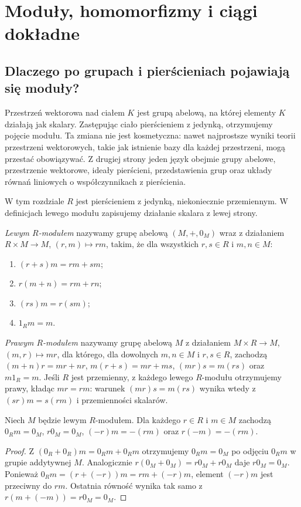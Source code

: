 \setlength{\parskip}{3pt}
\chapter{Moduły, homomorfizmy i ciągi dokładne}
\label{aa:ch:modules-introduction}

\providecommand{\atlasref}[2]{#2}


\section{Dlaczego po grupach i pierścieniach pojawiają się moduły?}
Przestrzeń wektorowa nad ciałem $K$ jest grupą abelową,
na której elementy $K$ działają jak skalary.
Zastępując ciało pierścieniem z jedynką, otrzymujemy
pojęcie modułu. Ta zmiana nie jest kosmetyczna: nawet
najprostsze wyniki teorii przestrzeni wektorowych,
takie jak istnienie bazy dla każdej przestrzeni, mogą
przestać obowiązywać. Z drugiej strony jeden język
obejmie grupy abelowe, przestrzenie wektorowe,
ideały pierścieni, przedstawienia grup oraz układy
równań liniowych o współczynnikach z pierścienia.

W tym rozdziale $R$ jest pierścieniem z jedynką,
niekoniecznie przemiennym. W definicjach lewego
modułu zapisujemy działanie skalara z lewej strony.

\begin{definicja}
\label{aa:def:modules-full}
\emph{Lewym $R$-modułem} nazywamy grupę abelową
$(M,+,0_M)$ wraz z działaniem $R\times M\to M$,
$(r,m)\mapsto rm$, takim, że dla wszystkich
$r,s\in R$ i $m,n\in M$:
\begin{enumerate}[label=\textup{(M\arabic*)}]
\item $(r+s)m=rm+sm$;
\item $r(m+n)=rm+rn$;
\item $(rs)m=r(sm)$;
\item $1_Rm=m$.
\end{enumerate}
\emph{Prawym $R$-modułem} nazywamy grupę abelową $M$
z działaniem $M\times R\to M$, $(m,r)\mapsto mr$,
dla którego, dla dowolnych $m,n\in M$ i $r,s\in R$,
zachodzą
$(m+n)r=mr+nr$, $m(r+s)=mr+ms$,
$(mr)s=m(rs)$ oraz $m1_R=m$.
Jeśli $R$ jest przemienny, z każdego lewego
$R$-modułu otrzymujemy prawy, kładąc $mr=rm$:
warunek $(mr)s=m(rs)$ wynika wtedy z
$(sr)m=s(rm)$ i przemienności skalarów.
\end{definicja}

\begin{stwierdzenie}
\label{aa:st:modules-zero-laws}
Niech $M$ będzie lewym $R$-modułem. Dla każdego
$r\in R$ i $m\in M$ zachodzą
$0_Rm=0_M$, $r0_M=0_M$,
$(-r)m=-(rm)$ oraz $r(-m)=-(rm)$.
\end{stwierdzenie}
\begin{proof}
Z $(0_R+0_R)m=0_Rm+0_Rm$ otrzymujemy
$0_Rm=0_M$ po odjęciu $0_Rm$ w grupie addytywnej
$M$. Analogicznie
$r(0_M+0_M)=r0_M+r0_M$ daje $r0_M=0_M$.
Ponieważ $0_Rm=(r+(-r))m=rm+(-r)m$, element
$(-r)m$ jest przeciwny do $rm$. Ostatnia równość
wynika tak samo z $r(m+(-m))=r0_M=0_M$.
\end{proof}

